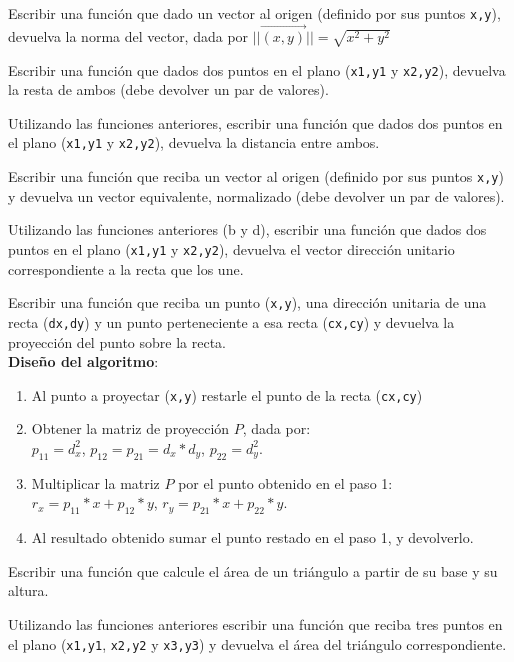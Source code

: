 \begin{partes}
    \item Escribir una función que dado un vector al origen (definido por sus
 puntos \verb!x,y!), devuelva la norma del vector, dada por
 $||\vec{(x,y)}||=\sqrt{x^2+y^2}$

    \item Escribir una función que dados dos puntos en el plano (\verb!x1,y1! y
 \verb!x2,y2!), devuelva la resta de ambos (debe devolver un par de
 valores).

    \item Utilizando las funciones anteriores, escribir una función que dados dos
 puntos en el plano (\verb!x1,y1! y \verb!x2,y2!), devuelva la distancia
 entre ambos.

    \item Escribir una función que reciba un vector al origen (definido por sus
 puntos \verb!x,y!) y devuelva un vector equivalente, normalizado (debe
 devolver un par de valores).

    \item Utilizando las funciones anteriores (b y d), escribir una función que
 dados dos puntos en el plano (\verb!x1,y1! y \verb!x2,y2!), devuelva el
 vector dirección unitario correspondiente a la recta que los une.

    \item Escribir una función que reciba un punto (\verb!x,y!), una dirección
 unitaria de una recta (\verb!dx,dy!) y un punto perteneciente a esa recta
 (\verb!cx,cy!) y devuelva la proyección del punto sobre la recta. \\
 {\bf Diseño del algoritmo}:
 \begin{enumerate}
     \setlength{\itemsep}{0pt}
     \setlength{\parsep}{0pt}
     \item Al punto a proyectar (\verb!x,y!) restarle el punto de la recta
 (\verb!cx,cy!)
     \item Obtener la matriz de proyección $P$, dada por:  \\
 $p_{11} = d_x^2$,  $p_{12} = p_{21} = d_x*d_y$, $p_{22} = d_y^2$.
     \item Multiplicar la matriz $P$ por el punto obtenido en el paso 1: \\
 $r_x = p_{11} * x + p_12 * y$, $r_y = p_{21} * x + p_{22} * y$.
     \item Al resultado obtenido sumar el punto restado en el paso 1, y
 devolverlo.
 \end{enumerate}

    \item Escribir una función que calcule el área de un triángulo a partir de
 su base y su altura.

    \item Utilizando las funciones anteriores escribir una función que reciba
 tres puntos en el plano (\verb!x1,y1!, \verb!x2,y2! y \verb!x3,y3!) y
 devuelva el área del triángulo correspondiente.
\end{partes}
